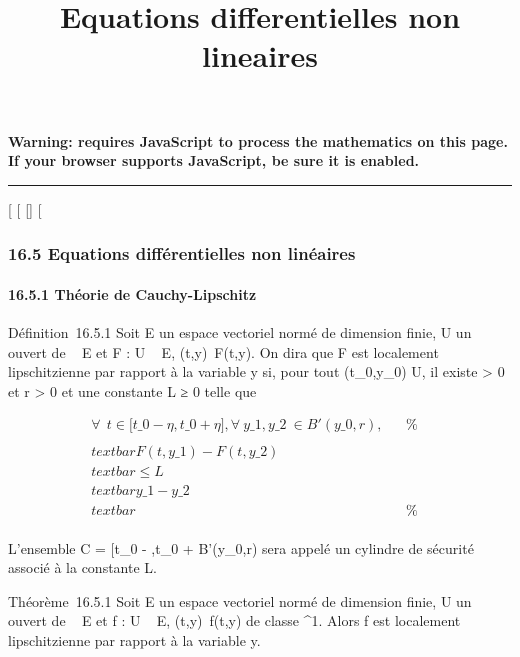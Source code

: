\documentclass[]{article}
\title{Equations differentielles non lineaires}
\author{}
\date{}
\begin{document}
\maketitle

\textbf{Warning: 
requires JavaScript to process the mathematics on this page.\\ If your
browser supports JavaScript, be sure it is enabled.}

\begin{center}\rule{3in}{0.4pt}\end{center}

{[}
{[}
{[}{]}
{[}

\subsubsection{16.5 Equations différentielles non linéaires}

\paragraph{16.5.1 Théorie de Cauchy-Lipschitz}

Définition~16.5.1 Soit E un espace vectoriel normé de dimension finie, U
un ouvert de ~ \times E et F : U \rightarrow~ E,
(t,y)\mapsto~F(t,y). On dira que F est localement
lipschitzienne par rapport à la variable y si, pour tout
(t\_0,y\_0) \in U, il existe \eta \textgreater{} 0 et r
\textgreater{} 0 et une constante L ≥ 0 telle que

\begin{align*} \forall~~t \in
{[}t\_0 - \eta,t\_0 + \eta{]},
\forall~y\_1,y\_2~ \in
B'(y\_0,r),& & \%& \\
\\textbar{}F(t,y\_1) -
F(t,y\_2)\\textbar{} \leq
L\\textbar{}y\_1 -
y\_2\\textbar{}& & \%&
\\ \end{align*}

L'ensemble C = {[}t\_0 - \eta,t\_0 + \eta{]} \times
B'(y\_0,r) sera appelé un cylindre de sécurité associé à la
constante L.

Théorème~16.5.1 Soit E un espace vectoriel normé de dimension finie, U
un ouvert de ~ \times E et f : U \rightarrow~ E, (t,y)\mapsto~f(t,y)
de classe ^1. Alors f est localement lipschitzienne par
rapport à la variable y.
\end{document}
